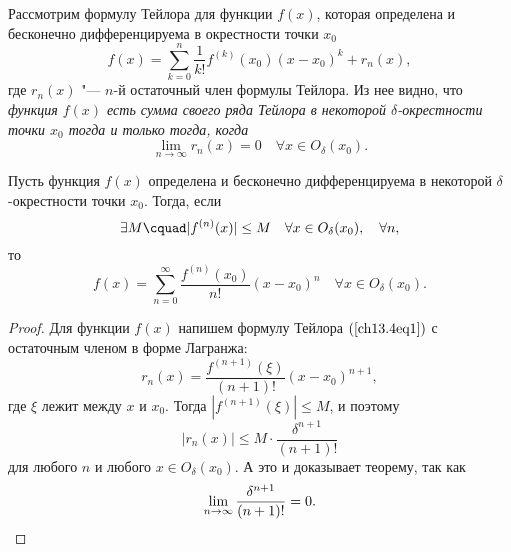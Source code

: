 Рассмотрим формулу Тейлора для функции $f(x)$, которая определена и бесконечно дифференцируема в окрестности точки $x_0$
\begin{equation} \label{ch13.4eq1}
f(x) = \sum\limits_{k = 0}^{n} \frac{1}{k!}f^{(k)}(x_0)(x - x_0)^k + r_n(x),
\end{equation}
где $r_n(x)$ "--- $n$-й остаточный член формулы Тейлора. Из нее видно, что \textit{функция $f(x)$ есть сумма своего ряда Тейлора в некоторой $\delta$-окрестности точки $x_0$ тогда и только тогда, когда}
$$
\lim\limits_{n \to \infty} r_n(x) = 0 \quad \forall x \in O_\delta(x_0).
$$
\begin{thm}
Пусть функция $f(x)$ определена и бесконечно дифференцируема в некоторой $\delta$-окрестности точки $x_0$. Тогда, если
$$
\exists M\cquad |f^{(n)}(x)| \le M \quad \forall x \in O_\delta(x_0), \quad \forall n,
$$ 
то
$$
f(x) = \sum\limits_{n = 0}^{\infty} \frac{f^{(n)}(x_0)}{n!}(x - x_0)^n \quad \forall x \in O_\delta(x_0).
$$
\end{thm}
\begin{proof}
Для функции $f(x)$ напишем формулу Тейлора $(\ref{ch13.4eq1})$ с остаточным членом в форме Лагранжа:
$$
r_n(x) = \frac{f^{(n+1)}(\xi)}{(n + 1)!} (x - x_0)^{n + 1},
$$
где $\xi$ лежит между $x$ и $x_0$. Тогда $|f^{(n+1)}(\xi)| \le M$, и поэтому
$$
|r_n(x)| \le M \cdot \frac{\delta^{n + 1}}{(n + 1)!}
$$
для любого $n$ и любого $x \in O_\delta(x_0)$. А это и доказывает теорему, так как
\begin{equation*}
\lim\limits_{n \to \infty} \frac{\delta^{n + 1}}{(n + 1)!} = 0. \qedhere
\end{equation*}
\end{proof}
